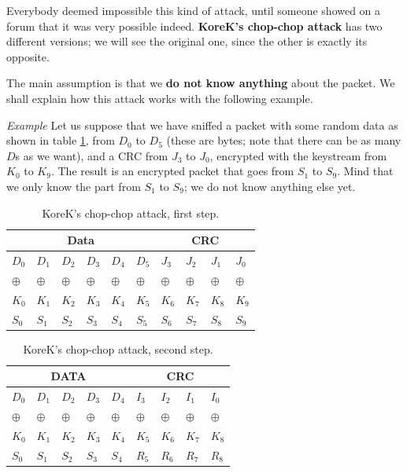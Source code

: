 Everybody deemed impossible this kind of attack, until someone showed on a forum that it was very possible indeed. \textbf{KoreK’s chop-chop attack} has two different versions; we will see the original one, since the other is exactly its opposite.

The main assumption is that we \textbf{do not know anything} about the packet. We shall explain how this attack works with the following example.

\vspace{0.5em}

\emph{Example} Let us suppose that we have sniffed a packet with some random data as shown in table \ref{tab:korek_1}, from $D_0$ to $D_5$ (these are bytes; note that there can be as many $D$s as we want), and a CRC from $J_3$ to $J_0$, encrypted with the keystream from $K_0$ to $K_9$. The result is an encrypted packet that goes from $S_1$ to $S_9$. Mind that we only know the part from $S_1$ to $S_9$; we do not know anything else yet.

\begin{table}[h]
    \centering
    \begin{tabular}{@{}llllll|llll@{}}
        \multicolumn{6}{c}{Data} & \multicolumn{4}{|c}{CRC}\\
        \midrule
        $D_0$ & $D_1$ & $D_2$ & $D_3$ & $D_4$ & $D_5$ & $J_3$ & $J_2$ & $J_1$ & $J_0$\\
        $\oplus$ & $\oplus$ & $\oplus$ & $\oplus$ & $\oplus$ & $\oplus$ & $\oplus$ & $\oplus$ & $\oplus$ & $\oplus$\\
        $K_0$ & $K_1$ & $K_2$ & $K_3$ & $K_4$ & $K_5$ & $K_6$ & $K_7$ & $K_8$ & $K_9$\\
        \midrule
        $S_0$ & $S_1$ & $S_2$ & $S_3$ & $S_4$ & $S_5$ & $S_6$ & $S_7$ & $S_8$ & $S_9$
    \end{tabular}
        \decoRule
        \caption{KoreK’s chop-chop attack, first step.}
        \label{tab:korek_1}
\end{table}

\begin{table}[h]
    \centering
    \begin{tabular}{@{}lllll|llll@{}}
        \multicolumn{5}{c}{DATA} & \multicolumn{4}{|c}{CRC}\\
        \midrule
        $D_0$ & $D_1$ & $D_2$ & $D_3$ & $D_4$ & $I_3$ & $I_2$ & $I_1$ & $I_0$\\
        $\oplus$ & $\oplus$ & $\oplus$ & $\oplus$ & $\oplus$ & $\oplus$ & $\oplus$ & $\oplus$ & $\oplus$\\
        $K_0$ & $K_1$ & $K_2$ & $K_3$ & $K_4$ & $K_5$ & $K_6$ & $K_7$ & $K_8$\\
        \midrule
        $S_0$ & $S_1$ & $S_2$ & $S_3$ & $S_4$ & $R_5$ & $R_6$ & $R_7$ & $R_8$
    \end{tabular}
        \decoRule
        \caption{KoreK’s chop-chop attack, second step.}
        \label{tab:korek_2}
\end{table}

